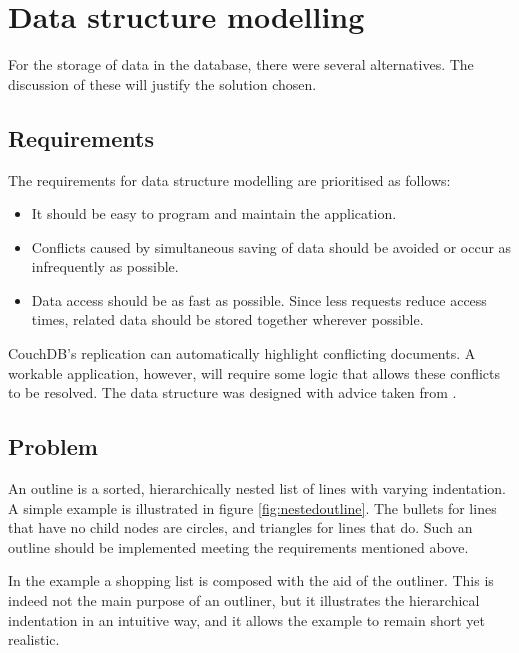 \section{Data structure modelling}

For the storage of data in the database, there were several alternatives. The discussion of these will justify the solution chosen.

\subsection{Requirements}
\label{subsec:ana-anf}

The requirements for data structure modelling are prioritised as follows:

\begin{itemize}
  \item It should be easy to program and maintain the application.
  \item Conflicts caused by simultaneous saving of data should be avoided or occur as infrequently as possible.
  \item Data access should be as fast as possible. Since less requests reduce access times, related data should be stored together wherever possible.
\end{itemize}

CouchDB's replication can automatically highlight conflicting documents. A workable application, however, will require some logic that allows these conflicts to be resolved. The data structure was designed with advice taken from \cite{design:replication}.

\subsection{Problem}

An outline is a sorted, hierarchically nested list of lines with varying indentation. A simple example is illustrated in figure \ref{fig:nestedoutline}. The bullets for lines that have no child nodes are circles, and triangles for lines that do. Such an outline should be implemented meeting the requirements mentioned above.

In the example a shopping list is composed with the aid of the outliner. This is indeed not the main purpose of an outliner, but it illustrates the hierarchical indentation in an intuitive way, and it allows the example to remain short yet realistic.
 
